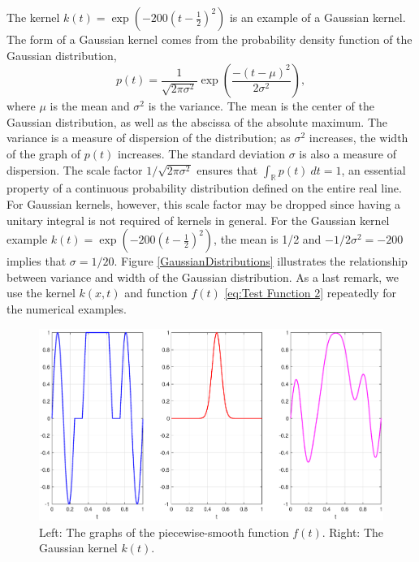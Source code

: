 \documentclass[12pt]{book}
\newcommand{\noiseSD}{\sigma}	%
\begin{document}
The kernel $k(t) = \exp(-200(t-\frac{1}{2})^2)$ is an example of a Gaussian kernel. The form of a Gaussian kernel comes from the probability density function of the Gaussian distribution,
\[p(t) = \frac{1}{\sqrt{2\pi\noiseSD^2}}\exp\left(\frac{-(t-\mu)^2}{2\noiseSD^2}\right),\]
where $\mu$ is the mean and $\noiseSD^2$ is the variance. The mean is the center of the Gaussian distribution, as well as the abscissa of the absolute maximum. The variance is a measure of dispersion of the distribution; as $\noiseSD^2$ increases, the width of the graph of $p(t)$ increases. The standard deviation $\noiseSD$ is also a measure of dispersion. The scale factor $1/\sqrt{2\pi\noiseSD^2}$ ensures that $\int_{\mathbb{R}} p(t) \: dt = 1$, an essential property of a continuous probability distribution defined on the entire real line. For Gaussian kernels, however, this scale factor may be dropped since having a unitary integral is not required of kernels in general.  For the Gaussian kernel example $k(t) = \exp(-200(t-\frac{1}{2})^2)$, the mean is 1/2 and $-1/2\noiseSD^2 = -200$ implies that $\noiseSD = 1/20$. Figure \ref{GaussianDistributions} illustrates the relationship between variance and width of the Gaussian distribution. As a last remark, we use the kernel $k(x,t)$ and function $f(t)$ \eqref{eq:Test Function 2} repeatedly for the numerical examples.

\begin{figure}
	\centerline{\includegraphics[scale=0.4]{Figures/FunctionKernelPlot.eps}}
\caption{Left: The graphs of the piecewise-smooth function $f(t)$. Right: The Gaussian kernel $k(t)$.}
\label{FunctionKernelPlot}
\end{figure}
\end{document}
